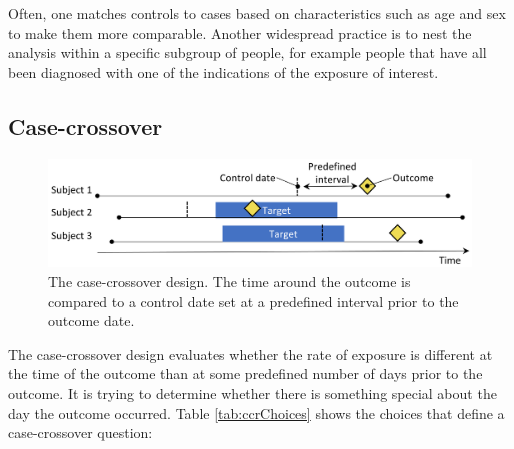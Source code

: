 \documentclass[11pt]{book}
\begin{document}
Often, one matches controls to cases based on characteristics such as
age and sex to make them more comparable. Another widespread practice is
to nest the analysis within a specific subgroup of people, for example
people that have all been diagnosed with one of the indications of the
exposure of interest.

\subsection{Case-crossover}\label{case-crossover}

\begin{figure}

{\centering \includegraphics[width=0.9\linewidth]{images/PopulationLevelEstimation/caseCrossover} 

}

\caption{The case-crossover design. The time around the outcome is compared to a control date set at a predefined interval prior to the outcome date.}\label{fig:caseCrossover}
\end{figure}

The case-crossover \citep{maclure_1991} design evaluates whether the
rate of exposure is different at the time of the outcome than at some
predefined number of days prior to the outcome. It is trying to
determine whether there is something special about the day the outcome
occurred. Table \ref{tab:ccrChoices} shows the choices that define a
case-crossover question:
\end{document}
